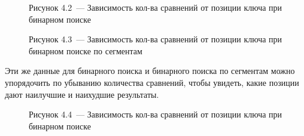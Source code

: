 \documentclass[12pt, a4paper]{report}
\begin{document}
	\begin{figure}[H]
		\caption*{Рисунок 4.2~--- Зависимость кол-ва сравнений от позиции ключа при бинарном поиске}
	\end{figure}
	
	\begin{figure}[H]
		\caption*{Рисунок 4.3~--- Зависимость кол-ва сравнений от позиции ключа при бинарном поиске по сегментам}
	\end{figure}
	
	Эти же данные для бинарного поиска и бинарного поиска по сегментам можно упорядочить по убыванию количества сравнений, чтобы увидеть, какие позиции дают наилучшие и наихудшие результаты.
	
	\begin{figure}[H]
		\caption*{Рисунок 4.4~--- Зависимость кол-ва сравнений от позиции ключа при бинарном поиске}
	\end{figure}
	
\end{document}
